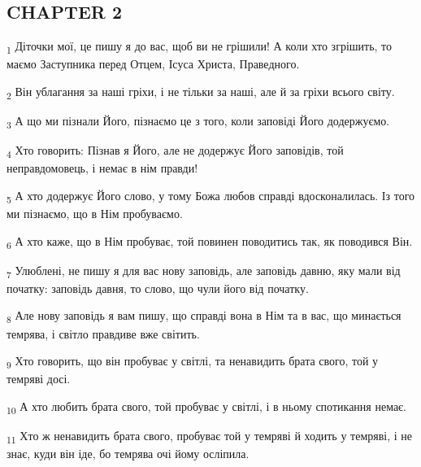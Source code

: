 \subsection{CHAPTER 2}
\begin{tcolorbox}
\textsubscript{1} Діточки мої, це пишу я до вас, щоб ви не грішили! А коли хто згрішить, то маємо Заступника перед Отцем, Ісуса Христа, Праведного.
\end{tcolorbox}
\begin{tcolorbox}
\textsubscript{2} Він ублагання за наші гріхи, і не тільки за наші, але й за гріхи всього світу.
\end{tcolorbox}
\begin{tcolorbox}
\textsubscript{3} А що ми пізнали Його, пізнаємо це з того, коли заповіді Його додержуємо.
\end{tcolorbox}
\begin{tcolorbox}
\textsubscript{4} Хто говорить: Пізнав я Його, але не додержує Його заповідів, той неправдомовець, і немає в нім правди!
\end{tcolorbox}
\begin{tcolorbox}
\textsubscript{5} А хто додержує Його слово, у тому Божа любов справді вдосконалилась. Із того ми пізнаємо, що в Нім пробуваємо.
\end{tcolorbox}
\begin{tcolorbox}
\textsubscript{6} А хто каже, що в Нім пробуває, той повинен поводитись так, як поводився Він.
\end{tcolorbox}
\begin{tcolorbox}
\textsubscript{7} Улюблені, не пишу я для вас нову заповідь, але заповідь давню, яку мали від початку: заповідь давня, то слово, що чули його від початку.
\end{tcolorbox}
\begin{tcolorbox}
\textsubscript{8} Але нову заповідь я вам пишу, що справді вона в Нім та в вас, що минається темрява, і світло правдиве вже світить.
\end{tcolorbox}
\begin{tcolorbox}
\textsubscript{9} Хто говорить, що він пробуває у світлі, та ненавидить брата свого, той у темряві досі.
\end{tcolorbox}
\begin{tcolorbox}
\textsubscript{10} А хто любить брата свого, той пробуває у світлі, і в ньому спотикання немає.
\end{tcolorbox}
\begin{tcolorbox}
\textsubscript{11} Хто ж ненавидить брата свого, пробуває той у темряві й ходить у темряві, і не знає, куди він іде, бо темрява очі йому осліпила.
\end{tcolorbox}
